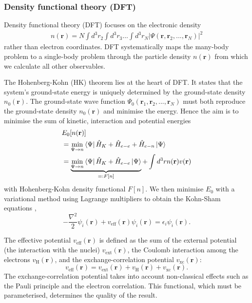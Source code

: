 \documentclass[10pt]{iopart}
\begin{document}
\subsubsection{Density functional theory (DFT)}\hfill

Density functional theory (DFT) \cite{Capelle2006} focuses on the electronic density 
\begin{gather}
n(\mathbf{r}) = N \int d^3 r_2 \int d^3 r_3 ... \int d^3 r_N \vert\Psi(\mathbf{r}, \mathbf{r}_2, ..., \mathbf{r}_N)\vert^2
\end{gather}
rather than electron coordinates. DFT systematically maps the many-body problem to a single-body problem through the particle density $n(\mathbf{r})$ from which we calculate all other observables.

The Hohenberg-Kohn (HK) theorem lies at the heart of DFT. It states that the system's ground-state energy is uniquely determined by the ground-state density $n_0(\mathbf{r})$. The ground-state wave function $\Psi_0(\mathbf{r}_1, \mathbf{r}_2, ..., \mathbf{r}_N)$ must both reproduce the ground-state density $n_0(\mathbf{r})$ and minimise the energy. Hence the aim is to minimise the sum of kinetic, interaction and potential energies
\begin{align}\label{HK}
&E_0[n(\mathbf{r})] \nonumber\\
&= \min_{\Psi \to n} \bra{\Psi} \hat{H}_K + \hat{H}_{e-e} + \hat{H}_{e-n} \ket{\Psi} \\
&= \underbrace{\min_{\Psi \to n} \bra{\Psi} \hat{H}_K + \hat{H}_{e-e} \ket{\Psi}}_{=: F[n]} + \int d^3 r n(\mathbf{r}) v(\mathbf{r})
\end{align}
with Hohenberg-Kohn density functional $F[n]$. We then minimise $E_0$ with a variational method using Lagrange multipliers to obtain the Kohn-Sham equations \cite{Baseden2014},
\begin{equation}
-\frac{\nabla^2}{2} \psi_i(\mathbf{r}) + v_{\text{eff}}(\mathbf{r})\psi_i(\mathbf{r}) = \epsilon_i \psi_i(\mathbf{r}).
\end{equation}

The effective potential $v_{\text{eff}}(\mathbf{r})$ is defined as the sum of the external potential (the interaction with the nuclei) $v_{\text{ext}}(\mathbf{r})$, the Coulomb interaction among the electrons $v_{\text{H}}(\mathbf{r})$, and the exchange-correlation potential $v_{\text{xc}}(\mathbf{r})$:
\begin{equation}
v_{\text{eff}}(\mathbf{r}) = v_{\text{ext}}(\mathbf{r}) + v_{\text{H}}(\mathbf{r}) + v_{\text{xc}}(\mathbf{r}).
\end{equation}
The exchange-correlation potential takes into account non-classical effects such as the Pauli principle and the electron correlation. This functional, which must be parameterised, determines the quality of the result.
\end{document}
